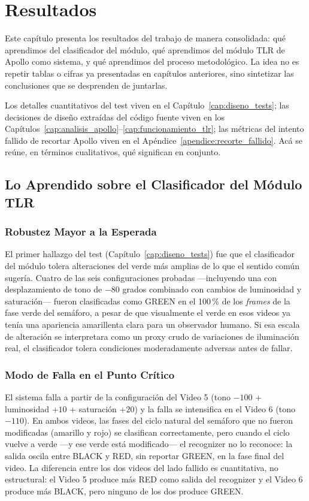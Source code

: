 \chapter{Resultados}
\label{cap:resultados}

Este capítulo presenta los resultados del trabajo de manera consolidada: qué aprendimos del clasificador del módulo, qué aprendimos del módulo TLR de Apollo como sistema, y qué aprendimos del proceso metodológico. La idea no es repetir tablas o cifras ya presentadas en capítulos anteriores, sino sintetizar las conclusiones que se desprenden de juntarlas.

Los detalles cuantitativos del test viven en el Capítulo~\ref{cap:diseno_tests}; las decisiones de diseño extraídas del código fuente viven en los Capítulos~\ref{cap:analisis_apollo}--\ref{cap:funcionamiento_tlr}; las métricas del intento fallido de recortar Apollo viven en el Apéndice~\ref{apendice:recorte_fallido}. Acá se reúne, en términos cualitativos, qué significan en conjunto.

\section{Lo Aprendido sobre el Clasificador del Módulo TLR}

\subsection{Robustez Mayor a la Esperada}

El primer hallazgo del test (Capítulo~\ref{cap:diseno_tests}) fue que el clasificador del módulo tolera alteraciones del verde más amplias de lo que el sentido común sugería. Cuatro de las seis configuraciones probadas ---incluyendo una con desplazamiento de tono de $-80$ grados combinado con cambios de luminosidad y saturación--- fueron clasificadas como GREEN en el 100\,\% de los \textit{frames} de la fase verde del semáforo, a pesar de que visualmente el verde en esos videos ya tenía una apariencia amarillenta clara para un observador humano. Si esa escala de alteración se interpretara como un proxy crudo de variaciones de iluminación real, el clasificador tolera condiciones moderadamente adversas antes de fallar.

\subsection{Modo de Falla en el Punto Crítico}

El sistema falla a partir de la configuración del Video 5 (tono $-100$ + luminosidad $+10$ + saturación $+20$) y la falla se intensifica en el Video 6 (tono $-110$). En ambos videos, las fases del ciclo natural del semáforo que no fueron modificadas (amarillo y rojo) se clasifican correctamente, pero cuando el ciclo vuelve a verde ---y ese verde está modificado--- el recognizer no lo reconoce: la salida oscila entre BLACK y RED, sin reportar GREEN, en la fase final del video. La diferencia entre los dos videos del lado fallido es cuantitativa, no estructural: el Video 5 produce más RED como salida del recognizer y el Video 6 produce más BLACK, pero ninguno de los dos produce GREEN.

